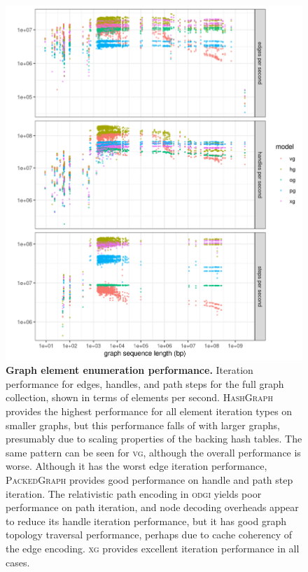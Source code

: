 \documentclass{article}
\begin{document}
\begin{figure}
  \centering
  \includegraphics[width=1.0\textwidth]{figures/iteration_per_second.png}
  \caption{
    \label{fig:prof2}
    \textbf{Graph element enumeration performance.}
    Iteration performance for edges, handles, and path steps for the full graph collection, shown in terms of elements per second.
    \textsc{HashGraph} provides the highest performance for all element iteration types on smaller graphs, but this performance falls of with larger graphs, presumably due to scaling properties of the backing hash tables.
    The same pattern can be seen for \textsc{vg}, although the overall performance is worse.
    Although it has the worst edge iteration performance, \textsc{PackedGraph} provides good performance on handle and path step iteration.
    The relativistic path encoding in \textsc{odgi} yields poor performance on path iteration, and node decoding overheads appear to reduce its handle iteration performance, but it has good graph topology traversal performance, perhaps due to cache coherency of the edge encoding.
    \textsc{xg} provides excellent iteration performance in all cases.
    }
\end{figure}
\end{document}
